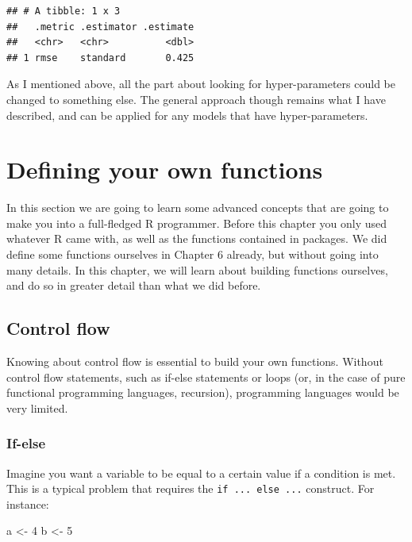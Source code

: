 \documentclass[
]{article}
\newenvironment{Shaded}{\begin{snugshade}}{\end{snugshade}}
\newcommand{\DecValTok}[1]{\textcolor[rgb]{0.00,0.00,0.81}{#1}}
\newcommand{\NormalTok}[1]{#1}
\newcommand{\OtherTok}[1]{\textcolor[rgb]{0.56,0.35,0.01}{#1}}
\begin{document}
\begin{verbatim}
## # A tibble: 1 x 3
##   .metric .estimator .estimate
##   <chr>   <chr>          <dbl>
## 1 rmse    standard       0.425
\end{verbatim}

As I mentioned above, all the part about looking for hyper-parameters could be changed to something
else. The general approach though remains what I have described, and can be applied for any models
that have hyper-parameters.

\hypertarget{defining-your-own-functions}{%
\section{Defining your own functions}\label{defining-your-own-functions}}

In this section we are going to learn some advanced concepts that are going to make you into a
full-fledged R programmer. Before this chapter you only used whatever R came with, as well as the
functions contained in packages. We did define some functions ourselves in Chapter 6 already, but
without going into many details. In this chapter, we will learn about building functions ourselves,
and do so in greater detail than what we did before.

\hypertarget{control-flow}{%
\subsection{Control flow}\label{control-flow}}

Knowing about control flow is essential to build your own functions. Without control flow statements,
such as if-else statements or loops (or, in the case of pure functional programming languages, recursion),
programming languages would be very limited.

\hypertarget{if-else}{%
\subsubsection{If-else}\label{if-else}}

Imagine you want a variable to be equal to a certain value if a condition is met. This is a typical
problem that requires the \texttt{if\ ...\ else\ ...} construct. For instance:

\begin{Shaded}
\begin{Highlighting}[]
\NormalTok{a }\OtherTok{\textless{}{-}} \DecValTok{4}
\NormalTok{b }\OtherTok{\textless{}{-}} \DecValTok{5}
\end{Highlighting}
\end{Shaded}
\end{document}
